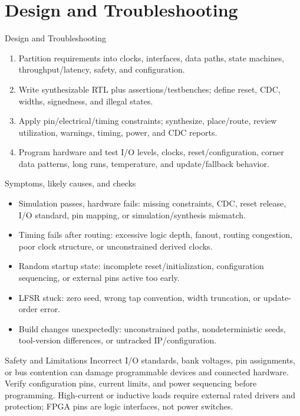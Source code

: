 \documentclass[10pt,letterpaper]{article}
\begin{document}
\section{Design and Troubleshooting}
\begin{CornellExamBox}{Design and Troubleshooting}
\begin{enumerate}
  \item Partition requirements into clocks, interfaces, data paths, state machines, throughput/latency, safety, and configuration.
  \item Write synthesizable RTL plus assertions/testbenches; define reset, CDC, widths, signedness, and illegal states.
  \item Apply pin/electrical/timing constraints; synthesize, place/route, review utilization, warnings, timing, power, and CDC reports.
  \item Program hardware and test I/O levels, clocks, reset/configuration, corner data patterns, long runs, temperature, and update/fallback behavior.
\end{enumerate}\end{CornellExamBox}
\begin{CornellExamBox}{Symptoms, likely causes, and checks}
\begin{itemize}
  \item Simulation passes, hardware fails: missing constraints, CDC, reset release, I/O standard, pin mapping, or simulation/synthesis mismatch.
  \item Timing fails after routing: excessive logic depth, fanout, routing congestion, poor clock structure, or unconstrained derived clocks.
  \item Random startup state: incomplete reset/initialization, configuration sequencing, or external pins active too early.
  \item LFSR stuck: zero seed, wrong tap convention, width truncation, or update-order error.
  \item Build changes unexpectedly: unconstrained paths, nondeterministic seeds, tool-version differences, or untracked IP/configuration.
\end{itemize}\end{CornellExamBox}
\begin{CornellWarningBox}{Safety and Limitations}
Incorrect I/O standards, bank voltages, pin assignments, or bus contention can damage programmable devices and connected hardware. Verify configuration pins, current limits, and power sequencing before programming. High-current or inductive loads require external rated drivers and protection; FPGA pins are logic interfaces, not power switches.
\end{CornellWarningBox}
\end{document}
